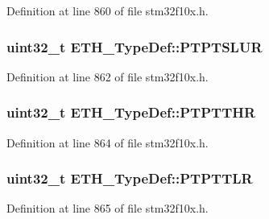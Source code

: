 Definition at line 860 of file stm32f10x.\+h.

\subsubsection[{\texorpdfstring{P\+T\+P\+T\+S\+L\+UR}{PTPTSLUR}}]{ {\bf uint32\+\_\+t} E\+T\+H\+\_\+\+Type\+Def\+::\+P\+T\+P\+T\+S\+L\+UR}\hypertarget{struct_e_t_h___type_def_a0b388c052998631c58d82536ecf3c560}{}\label{struct_e_t_h___type_def_a0b388c052998631c58d82536ecf3c560}


Definition at line 862 of file stm32f10x.\+h.

\subsubsection[{\texorpdfstring{P\+T\+P\+T\+T\+HR}{PTPTTHR}}]{ {\bf uint32\+\_\+t} E\+T\+H\+\_\+\+Type\+Def\+::\+P\+T\+P\+T\+T\+HR}\hypertarget{struct_e_t_h___type_def_a10ebf9b64b96114e8bc16bf03d24a4b2}{}\label{struct_e_t_h___type_def_a10ebf9b64b96114e8bc16bf03d24a4b2}


Definition at line 864 of file stm32f10x.\+h.

\subsubsection[{\texorpdfstring{P\+T\+P\+T\+T\+LR}{PTPTTLR}}]{ {\bf uint32\+\_\+t} E\+T\+H\+\_\+\+Type\+Def\+::\+P\+T\+P\+T\+T\+LR}\hypertarget{struct_e_t_h___type_def_a018a92d638dd4bd98b1640c8dae2a289}{}\label{struct_e_t_h___type_def_a018a92d638dd4bd98b1640c8dae2a289}


Definition at line 865 of file stm32f10x.\+h.

